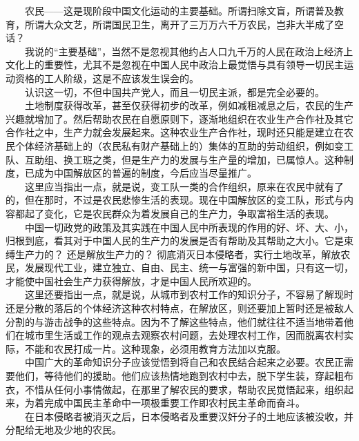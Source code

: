 \documentclass[cn,11pt,chinese]{elegantbook}
\begin{document}
　　农民——这是现阶段中国文化运动的主要基础。所谓扫除文盲，所谓普及教育，所谓大众文艺，所谓国民卫生，离开了三万万六千万农民，岂非大半成了空话？\\
　　我说的“主要基础”，当然不是忽视其他约占人口九千万的人民在政治上经济上文化上的重要性，尤其不是忽视在中国人民中政治上最觉悟与具有领导一切民主运动资格的工人阶级，这是不应该发生误会的。\\
　　认识这一切，不但中国共产党人，而且一切民主派，都是完全必要的。\\
　　土地制度获得改革，甚至仅获得初步的改革，例如减租减息之后，农民的生产兴趣就增加了。然后帮助农民在自愿原则下，逐渐地组织在农业生产合作社及其它合作社之中，生产力就会发展起来。这种农业生产合作社，现时还只能是建立在农民个体经济基础上的（农民私有财产基础上的）集体的互助的劳动组织，例如变工队、互助组、换工班之类，但是生产力的发展与生产量的增加，已属惊人。这种制度，已成为中国解放区的普遍的制度，今后应当尽量推广。\\
　　这里应当指出一点，就是说，变工队一类的合作组织，原来在农民中就有了的，但在那时，不过是农民悲惨生活的表现。现在中国解放区的变工队，形式与内容都起了变化，它是农民群众为着发展自己的生产力，争取富裕生活的表现。\\
　　中国一切政党的政策及其实践在中国人民中所表现的作用的好、坏、大、小，归根到底，看其对于中国人民的生产力的发展是否有帮助及其帮助之大小。它是束缚生产力的？ 还是解放生产力的？ 彻底消灭日本侵略者，实行土地改革，解放农民，发展现代工业，建立独立、自由、民主、统一与富强的新中国，只有这一切，才能使中国社会生产力获得解放，才是中国人民所欢迎的。\\
　　这里还要指出一点，就是说，从城市到农村工作的知识分子，不容易了解现时还是分散的落后的个体经济这种农村特点，在解放区，则还要加上暂时还是被敌人分割的与游击战争的这些特点。因为不了解这些特点，他们就往往不适当地带着他们在城市里生活或工作的观点去观察农村问题，去处理农村工作，因而脱离农村实际，不能和农民打成一片。这种现象，必须用教育方法加以克服。\\
　　中国广大的革命知识分子应该觉悟到将自己和农民结合起来之必要。农民正需要他们，等待他们的援助。他们应该热情地跑到农村中去，脱下学生装，穿起粗布衣，不惜从任何小事情做起，在那里了解农民的要求，帮助农民觉悟起来，组织起来，为着完成中国民主革命中一项极重要工作即农村民主革命而奋斗。\\
　　在日本侵略者被消灭之后，日本侵略者及重要汉奸分子的土地应该被没收，并分配给无地及少地的农民。\\
\end{document}
